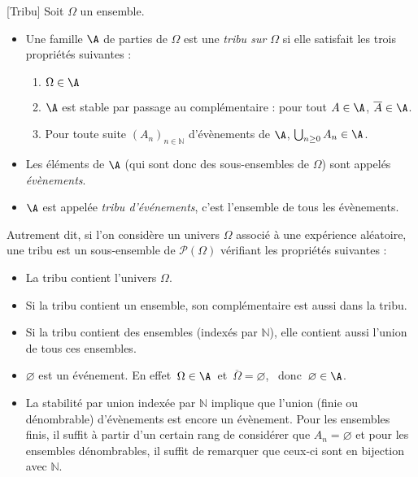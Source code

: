 \documentclass[a4paper,10pt]{report}
\begin{document}
\begin{Definition}{}[Tribu]
Soit $\Omega $ un ensemble. 
\begin{itemize}
\item Une famille $\A$ de parties de $\Omega$ est une \emph{tribu sur $\Omega$} si elle satisfait les trois propriétés suivantes :
\begin{enumerate}
\item $\Omega \in\A$ 
\item $\A$ est stable par passage au complémentaire : pour tout $A \in\A$,  $\overline{A} \in \A$.
\item Pour toute suite $(A_n)_{n \in \mathbb{N}}$ d'évènements de $\A$, $\bigcup_{n \geq 0} A_n \in \A$.
\end{enumerate}
\item Les éléments de $\A$ (qui sont donc des sous-ensembles de $\Omega$) sont appelés \emph{évènements}.
\item $\A$ est appelée \emph{tribu d'événements}, c'est l'ensemble de tous les évènements.
\end{itemize}
\end{Definition}

\vspace{0.2cm}

Autrement dit, si l'on considère un univers $\Omega$ associé à une expérience aléatoire, une tribu est un sous-ensemble de $\mathcal{P}(\Omega)$ vérifiant les propriétés suivantes :
\begin{itemize}
\item La tribu contient l'univers $\Omega$.
\item Si la tribu contient un ensemble, son complémentaire est aussi dans la tribu.
\item Si la tribu contient des ensembles (indexés par $\mathbb{N}$), elle contient aussi l'union de tous ces ensembles.
\end{itemize}

\vspace{0.2cm}

\begin{Remarques}{}
\begin{itemize}
\item $\varnothing$ est un événement. En effet $\,\Omega \in\A\,$ et $\,\overline{\Omega} = \varnothing$, \ donc $\,\varnothing\in\A$.
\item La stabilité par union indexée par $\mathbb{N}$ implique que l'union (finie ou dénombrable) d'évènements est encore un évènement. Pour les ensembles finis, il suffit à partir d'un certain rang de considérer que $A_n = \varnothing$ et pour les ensembles dénombrables, il suffit de remarquer que ceux-ci sont en bijection avec $\mathbb{N}$.
\end{itemize}
\end{Remarques}{}
\end{document}
